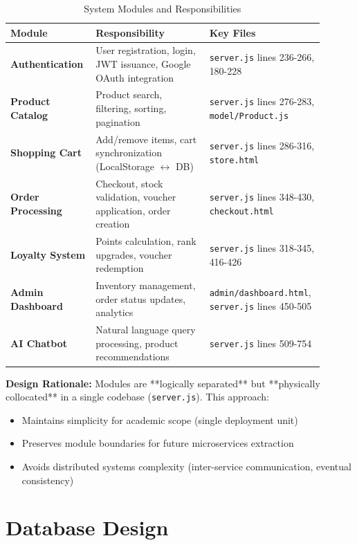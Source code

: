 \documentclass[12pt, a4paper]{report}
\begin{document}
\begin{table}[H]
\centering
\caption{System Modules and Responsibilities}
\label{tab:modules}
\begin{tabular}{@{}p{0.25\linewidth}p{0.35\linewidth}p{0.30\linewidth}@{}}
\toprule
\textbf{Module} & \textbf{Responsibility} & \textbf{Key Files} \\
\midrule
\textbf{Authentication} & User registration, login, JWT issuance, Google OAuth integration & \texttt{server.js} lines 236-266, 180-228 \\
\textbf{Product Catalog} & Product search, filtering, sorting, pagination & \texttt{server.js} lines 276-283, \texttt{model/Product.js} \\
\textbf{Shopping Cart} & Add/remove items, cart synchronization (LocalStorage $\leftrightarrow$ DB) & \texttt{server.js} lines 286-316, \texttt{store.html} \\
\textbf{Order Processing} & Checkout, stock validation, voucher application, order creation & \texttt{server.js} lines 348-430, \texttt{checkout.html} \\
\textbf{Loyalty System} & Points calculation, rank upgrades, voucher redemption & \texttt{server.js} lines 318-345, 416-426 \\
\textbf{Admin Dashboard} & Inventory management, order status updates, analytics & \texttt{admin/dashboard.html}, \texttt{server.js} lines 450-505 \\
\textbf{AI Chatbot} & Natural language query processing, product recommendations & \texttt{server.js} lines 509-754 \\
\bottomrule
\end{tabular}
\end{table}

\textbf{Design Rationale:} Modules are **logically separated** but **physically collocated** in a single codebase (\texttt{server.js}). This approach:
\begin{itemize}
    \item Maintains simplicity for academic scope (single deployment unit)
    \item Preserves module boundaries for future microservices extraction
    \item Avoids distributed systems complexity (inter-service communication, eventual consistency)
\end{itemize}

\section{Database Design}
\end{document}
